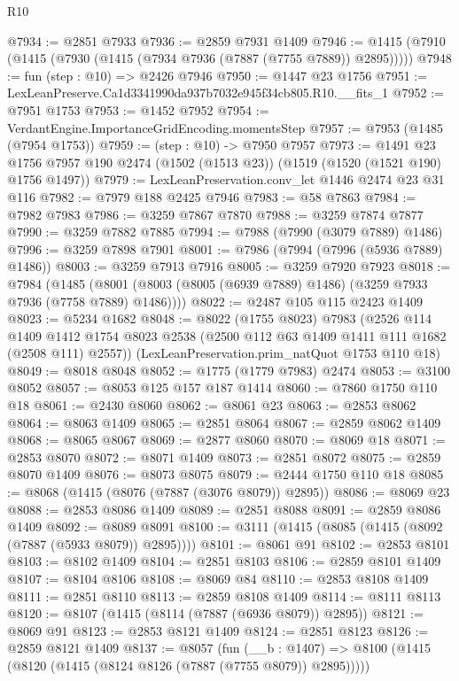 \begin{lexlean}{R10}
\begin{coremodule}
@7934 := @2851 @7933
@7936 := @2859 @7931 @1409
@7946 := @1415 (@7910 (@1415 (@7930 (@1415 (@7934 @7936 (@7887 (@7755 @7889)) @2895)))))
@7948 := fun (step : @10) => @2426 @7946
@7950 := @1447 @23 @1756
@7951 := LexLeanPreserve.Ca1d3341990da937b7032e945f34cb805.R10.__fits_1
@7952 := @7951 @1753
@7953 := @1452 @7952
@7954 := VerdantEngine.ImportanceGridEncoding.momentsStep
@7957 := @7953 (@1485 (@7954 @1753))
@7959 := (step : @10) -> @7950 @7957
@7973 := @1491
    @23
    @1756
    @7957
    @190
    @2474
    (@1502 (@1513 @23))
    (@1519 (@1520 (@1521 @190) @1756 @1497))
@7979 := LexLeanPreservation.conv_let @1446 @2474 @23 @31 @116
@7982 := @7979 @188 @2425 @7946
@7983 := @58 @7863
@7984 := @7982 @7983
@7986 := @3259 @7867 @7870
@7988 := @3259 @7874 @7877
@7990 := @3259 @7882 @7885
@7994 := @7988 (@7990 (@3079 @7889) @1486)
@7996 := @3259 @7898 @7901
@8001 := @7986 (@7994 (@7996 (@5936 @7889) @1486))
@8003 := @3259 @7913 @7916
@8005 := @3259 @7920 @7923
@8018 := @7984
    (@1485 (@8001 (@8003 (@8005 (@6939 @7889) @1486) (@3259 @7933 @7936 (@7758 @7889) @1486))))
@8022 := @2487 @105 @115 @2423 @1409
@8023 := @5234 @1682
@8048 := @8022
    (@1755 @8023)
    @7983
    (@2526
      @114
      @1409
      @1412
      @1754
      @8023
      @2538
      (@2500 @112 @63 @1409 @1411 @111 @1682 (@2508 @111) @2557))
    (LexLeanPreservation.prim_natQuot @1753 @110 @18)
@8049 := @8018 @8048
@8052 := @1775 (@1779 @7983) @2474
@8053 := @3100 @8052
@8057 := @8053 @125 @157 @187 @1414
@8060 := @7860 @1750 @110 @18
@8061 := @2430 @8060
@8062 := @8061 @23
@8063 := @2853 @8062
@8064 := @8063 @1409
@8065 := @2851 @8064
@8067 := @2859 @8062 @1409
@8068 := @8065 @8067
@8069 := @2877 @8060
@8070 := @8069 @18
@8071 := @2853 @8070
@8072 := @8071 @1409
@8073 := @2851 @8072
@8075 := @2859 @8070 @1409
@8076 := @8073 @8075
@8079 := @2444 @1750 @110 @18
@8085 := @8068 (@1415 (@8076 (@7887 (@3076 @8079)) @2895))
@8086 := @8069 @23
@8088 := @2853 @8086 @1409
@8089 := @2851 @8088
@8091 := @2859 @8086 @1409
@8092 := @8089 @8091
@8100 := @3111 (@1415 (@8085 (@1415 (@8092 (@7887 (@5933 @8079)) @2895))))
@8101 := @8061 @91
@8102 := @2853 @8101
@8103 := @8102 @1409
@8104 := @2851 @8103
@8106 := @2859 @8101 @1409
@8107 := @8104 @8106
@8108 := @8069 @84
@8110 := @2853 @8108 @1409
@8111 := @2851 @8110
@8113 := @2859 @8108 @1409
@8114 := @8111 @8113
@8120 := @8107 (@1415 (@8114 (@7887 (@6936 @8079)) @2895))
@8121 := @8069 @91
@8123 := @2853 @8121 @1409
@8124 := @2851 @8123
@8126 := @2859 @8121 @1409
@8137 := @8057
    (fun (__b : @1407) => @8100 (@1415 (@8120 (@1415 (@8124 @8126 (@7887 (@7755 @8079)) @2895)))))

\end{coremodule}
\end{lexlean}
